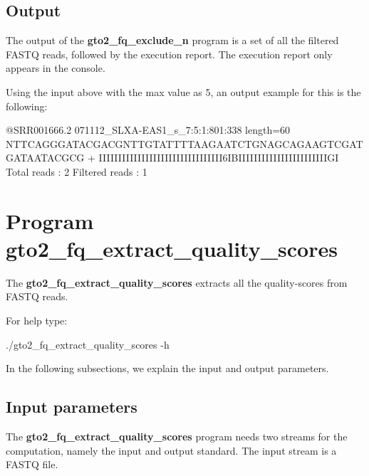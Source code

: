 \documentclass[11pt,]{krantz}
\newenvironment{Shaded}{\begin{snugshade}}{\end{snugshade}}
\newcommand{\ExtensionTok}[1]{#1}
\newcommand{\NormalTok}[1]{#1}
\begin{document}
\subsection*{Output}\label{output-2}


The output of the \textbf{gto2\_fq\_exclude\_n} program is a set of all
the filtered FASTQ reads, followed by the execution report. The
execution report only appears in the console.

Using the input above with the max value as 5, an output example for
this is the following:

\begin{Shaded}
\begin{Highlighting}[]
\ExtensionTok{@SRR001666.2}\NormalTok{ 071112_SLXA-EAS1_s_7:5:1:801:338 length=60}
\ExtensionTok{NTTCAGGGATACGACGNTTGTATTTTAAGAATCTGNAGCAGAAGTCGATGATAATACGCG}
\ExtensionTok{+}
\ExtensionTok{IIIIIIIIIIIIIIIIIIIIIIIIIIIIIIII6IBIIIIIIIIIIIIIIIIIIIIIIIGI}
\ExtensionTok{Total}\NormalTok{ reads    : 2}
\ExtensionTok{Filtered}\NormalTok{ reads : 1}
\end{Highlighting}
\end{Shaded}

\section{Program
gto2\_fq\_extract\_quality\_scores}\label{program-gto2_fq_extract_quality_scores}

The \textbf{gto2\_fq\_extract\_quality\_scores} extracts all the
quality-scores from FASTQ reads.

For help type:

\begin{Shaded}
\begin{Highlighting}[]
\ExtensionTok{./gto2_fq_extract_quality_scores}\NormalTok{ -h}
\end{Highlighting}
\end{Shaded}

In the following subsections, we explain the input and output
parameters.

\subsection*{Input parameters}\label{input-parameters-3}


The \textbf{gto2\_fq\_extract\_quality\_scores} program needs two
streams for the computation, namely the input and output standard. The
input stream is a FASTQ file.
\end{document}
